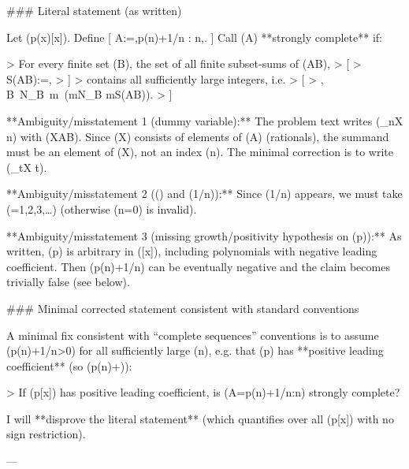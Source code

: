 ### Literal statement (as written)

Let (p(x)\in{}[x]). Define
[
A:={,p(n)+1/n : n\in{},}.
]
Call (A) **strongly complete** if:

> For every finite set (B), the set of all finite subset-sums of (A\setminus B),
> [
> S(A\setminus B):=,
> ]
> contains all sufficiently large integers, i.e.
> [
> \forall, B\ \exists N_B\in{}\ \forall m\in{}\ (m\ge N_B \implies m\in S(A\setminus B)).
> ]

**Ambiguity/misstatement 1 (dummy variable):** The problem text writes (\sum_{n\in X} n) with (X\subseteq A\setminus B). Since (X) consists of elements of (A) (rationals), the summand must be an element of (X), not an index (n). The minimal correction is to write (\sum_{t\in X} t).

**Ambiguity/misstatement 2 (() and (1/n)):** Since (1/n) appears, we must take (={1,2,3,\dots}) (otherwise (n=0) is invalid).

**Ambiguity/misstatement 3 (missing growth/positivity hypothesis on (p)):** As written, (p) is arbitrary in ([x]), including polynomials with negative leading coefficient. Then (p(n)+1/n) can be eventually negative and the claim becomes trivially false (see below).

### Minimal corrected statement consistent with standard conventions

A minimal fix consistent with “complete sequences” conventions is to assume (p(n)+1/n>0) for all sufficiently large (n), e.g. that (p) has **positive leading coefficient** (so (p(n)\to+\infty)):

> If (p\in{}[x]) has positive leading coefficient, is (A={p(n)+1/n:n}) strongly complete?

I will **disprove the literal statement** (which quantifies over all (p\in{}[x]) with no sign restriction).

---
